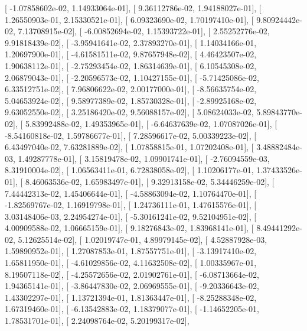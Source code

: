 \documentclass{article}
\begin{document}
       [ -1.07858602e-02,   1.14933064e-01],
       [  9.36112786e-02,   1.94188027e-01],
       [  1.26550903e-01,   2.15330521e-01],
       [  6.09323690e-02,   1.70197410e-01],
       [  9.80924442e-02,   7.13708915e-02],
       [ -6.00852694e-02,   1.15393722e-01],
       [  2.55252776e-02,   9.91818439e-02],
       [ -3.95941641e-02,   2.37893270e-01],
       [  1.14034166e-01,   1.20697900e-01],
       [ -4.61581511e-02,   9.87657948e-02],
       [  4.46423507e-02,   1.90638112e-01],
       [ -2.75293454e-02,   1.86314639e-01],
       [  6.10545308e-02,   2.06879043e-01],
       [ -2.20596573e-02,   1.10427155e-01],
       [ -5.71425086e-02,   6.33512751e-02],
       [  7.96806622e-02,   2.00177000e-01],
       [ -8.56635754e-02,   5.04653924e-02],
       [  9.58977389e-02,   1.85730328e-01],
       [ -2.89925168e-02,   9.63052550e-02],
       [  3.25186420e-02,   9.56088157e-02],
       [  5.08624033e-02,   5.89843770e-02],
       [  5.83992488e-02,   1.49353965e-01],
       [ -6.64637639e-02,   1.07087026e-01],
       [ -8.54160818e-02,   1.59786677e-01],
       [  7.28596617e-02,   5.00339223e-02],
       [  6.43497040e-02,   7.63281889e-02],
       [  1.07858815e-01,   1.07202408e-01],
       [  3.48882484e-03,   1.49287778e-01],
       [  3.15819478e-02,   1.09901741e-01],
       [ -2.76094559e-03,   8.31910004e-02],
       [  1.06563411e-01,   6.72838058e-02],
       [  1.10206177e-01,   1.37433526e-01],
       [  8.46063536e-02,   1.65983497e-01],
       [  9.32913158e-02,   5.34446259e-02],
       [  7.44442313e-02,   1.45406644e-01],
       [ -4.58863094e-02,   1.10764470e-01],
       [ -1.82569767e-02,   1.16919798e-01],
       [  1.24736111e-01,   1.47615576e-01],
       [  3.03148406e-03,   2.24954274e-01],
       [ -5.30161241e-02,   9.52104951e-02],
       [  4.00909588e-02,   1.06665159e-01],
       [  9.18276843e-02,   1.83968141e-01],
       [  8.49441292e-02,   5.12625514e-02],
       [  1.02019747e-01,   4.89979145e-02],
       [  4.52887928e-03,   1.59890952e-01],
       [  1.27087853e-01,   1.87557751e-01],
       [ -3.13917410e-02,   1.65811950e-01],
       [ -4.61029856e-02,   4.11632508e-02],
       [  1.00335967e-01,   8.19507118e-02],
       [ -4.25572656e-02,   2.01902761e-01],
       [ -6.08713664e-02,   1.94365141e-01],
       [ -3.86447830e-02,   2.06969555e-01],
       [ -9.20336643e-02,   1.43302297e-01],
       [  1.13721394e-01,   1.81363447e-01],
       [ -8.25288348e-02,   1.67319460e-01],
       [ -6.13542883e-02,   1.18379077e-01],
       [ -1.14652205e-01,   1.78531701e-01],
       [  2.24098764e-02,   5.20199317e-02],
\end{document}
